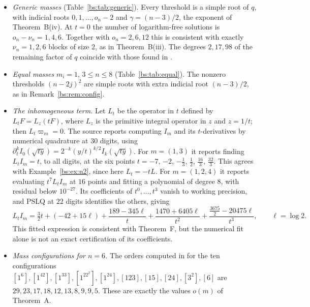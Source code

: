 \documentclass[11pt,a4paper]{article}
\theoremstyle{definition}
\theoremstyle{remark}
\numberwithin{equation}{section}
\begin{document}
\begin{itemize}
\item \emph{Generic masses} (Table~\ref{bs:tab:generic}). Every threshold is a simple root of $q$, with indicial roots $0,1,\dots,o_n-2$ and $\gamma=(n-3)/2$, the exponent of Theorem~B(iv). At $t=0$ the number of logarithm-free solutions is $o_n-\nu_n=1,4,6$. Together with $o_n=2,6,12$ this is consistent with exactly $\nu_n=1,2,6$ blocks of size $2$, as in Theorem~B(iii). The degrees $2,17,98$ of the remaining factor of $q$ coincide with those found in \cite{LV23}.
\item \emph{Equal masses} $m_i=1$, $3\le n\le8$ (Table~\ref{bs:tab:equal}). The nonzero thresholds $(n-2j)^2$ are simple roots with extra indicial root $(n-3)/2$, as in Remark~\ref{bs:rem:config}.
\item \emph{The inhomogeneous term.} Let $L_t$ be the operator in $t$ defined by $L_tF=L_z(tF)$, where $L_z$ is the primitive integral operator in $z$ and $z=1/t$; then $L_t\varpi_m=0$. The source reports computing $I_m$ and its $t$-derivatives by numerical quadrature at $30$ digits, using $\partial_t^kI_0(\sqrt{ty})=2^{-k}(y/t)^{k/2}I_k(\sqrt{ty})$. For $m=(1,3)$ it reports finding $L_tI_m=t$, to all digits, at the six points $t=-7$, $-2$, $-\frac13$, $\frac12$, $\frac{16}3$, $\frac{32}3$. This agrees with Example~\ref{bs:ex:n2}, since here $L_t=-tL$. For $m=(1,2,4)$ it reports evaluating $t^7L_tI_m$ at $16$ points and fitting a polynomial of degree $8$, with residual below $10^{-27}$. Its coefficients of $t^0,\dots,t^3$ vanish to working precision, and PSLQ at $22$ digits identifies the others, giving
\[
L_tI_m=\tfrac32t+(-42+15\ell)+\frac{189-345\ell}{t}+\frac{1470+6405\ell}{t^2}+\frac{\frac{3675}2-20475\ell}{t^3},\qquad\ell=\log2.
\]
This fitted expression is consistent with Theorem~F, but the numerical fit alone is not an exact certification of its coefficients.
\item \emph{Mass configurations for $n=6$.} The orders computed in \cite[\S4.5]{LV23} for the ten configurations $[1^6],[1^42],[1^33],[1^22^2],[1^24],[123],[15],[24],[3^2],[6]$ are $29,23,17,18,12,13,8,9,9,5$. These are exactly the values $o(m)$ of Theorem~A.
\end{itemize}
\end{document}

